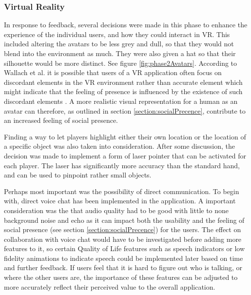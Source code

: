 \subsubsection{Virtual Reality}
In response to feedback, several decisions were made in this phase to enhance the experience of the individual users, and how they could interact in VR. This included altering the avatars to be less grey and dull, so that they would not blend into the environment as much. They were also given a hat so that their silhouette would be more distinct.  See figure \ref{fig:phase2Avatars}.
According  to  Wallach  et  al. it is possible that users of a VR application often focus on discordant elements in the VR environment rather than accurate element which might indicate that the feeling of presence is influenced by the existence of such discordant elements \cite{presenceInVirtualReality:}. A more realistic visual representation for a human as an avatar can therefore, as outlined in section \ref{section:socialPrecence}, contribute to an increased feeling of social presence. 

Finding a way to let players highlight either their own location or the location of a specific object was also taken into consideration. After some discussion, the decision was made to implement a form of laser pointer that can be activated for each player. The laser has significantly more accuracy than the standard hand, and can be used to pinpoint rather small objects. 

Perhaps most important was the possibility of direct communication. To begin with, direct voice chat has been implemented in the application. A important consideration was the that audio quality had to be good with little to none background noise and echo as it can impact both the usability and the feeling of social presence (see section \ref{section:socialPrecence}) for the users. 
The effect on collaboration with voice chat would have to be investigated before adding more features to it, so certain Quality of Life features such as speech indicators or low fidelity animations to indicate speech could be implemented later based on time and further feedback. If users feel that it is hard to figure out who is talking, or where the other users are, the importance of these features can be adjusted to more accurately reflect their perceived value to the overall application.


